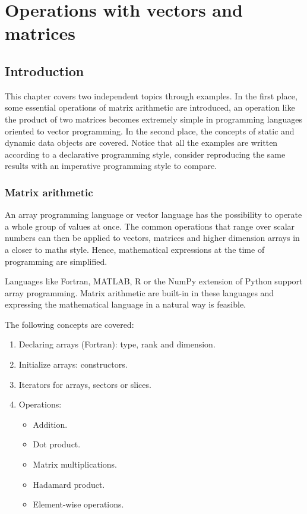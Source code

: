 \chapter{Operations with vectors and matrices}    \label{chap:matrices}


\vspace{-.7cm}
\section{Introduction}

This chapter covers two independent topics through examples. 
In the first place, some essential operations of matrix arithmetic are introduced, 
an operation like the product of two matrices becomes extremely simple 
in programming languages oriented to vector programming. 
In the second place, the concepts of static and dynamic data objects are covered. 
Notice that all the examples are written according to a declarative programming style, 
consider reproducing the same results with an imperative programming style to compare.
    
    \vspace{-.3cm}
    \subsection*{Matrix arithmetic}
    \vspace{-.2cm}

An array programming language or vector language has the possibility 
to operate a whole group of values at once.
The common operations that range over scalar numbers can then be applied to vectors, 
matrices and higher dimension arrays in a closer to maths style. 
Hence, mathematical expressions at the time of programming are simplified.

Languages like Fortran, MATLAB, R or the NumPy extension of Python support array programming.
Matrix arithmetic are built-in in these languages and expressing the mathematical language in a natural way is feasible.

\newpage
The following concepts are covered:
\begin{enumerate}[noitemsep]
    \item Declaring arrays (Fortran): type, rank and dimension.
    \item Initialize arrays: constructors. 
    \item Iterators for arrays, sectors or slices. 
    \item Operations:
    \begin{itemize}
        \item Addition. 
        \item Dot product.
        \item Matrix multiplications. 
        \item Hadamard product. 
        \item Element-wise operations.    
    \end{itemize}
\end{enumerate}  


